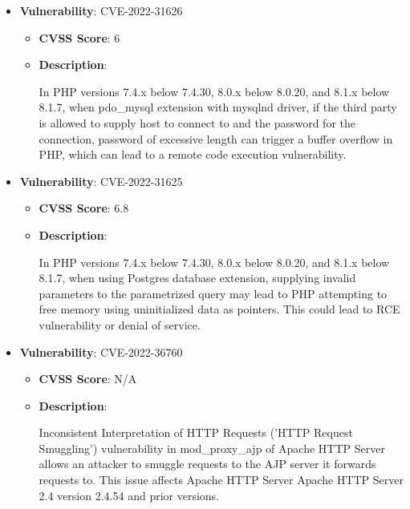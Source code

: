 \documentclass{article}
\begin{document}
\begin{itemize}
        \item \textbf{Vulnerability}: CVE-2022-31626
        \begin{itemize}
            \item \textbf{CVSS Score}:  6 
            \item \textbf{Description}:
            \parbox[t]{0.9\linewidth}{
                \ttfamily In PHP versions 7.4.x below 7.4.30, 8.0.x below 8.0.20, and 8.1.x below 8.1.7, when pdo\_mysql extension with mysqlnd driver, if the third party is allowed to supply host to connect to and the password for the connection, password of excessive length can trigger a buffer overflow in PHP, which can lead to a remote code execution vulnerability.
            }
        \end{itemize}
    
        \item \textbf{Vulnerability}: CVE-2022-31625
        \begin{itemize}
            \item \textbf{CVSS Score}:  6.8 
            \item \textbf{Description}:
            \parbox[t]{0.9\linewidth}{
                \ttfamily In PHP versions 7.4.x below 7.4.30, 8.0.x below 8.0.20, and 8.1.x below 8.1.7, when using Postgres database extension, supplying invalid parameters to the parametrized query may lead to PHP attempting to free memory using uninitialized data as pointers. This could lead to RCE vulnerability or denial of service.
            }
        \end{itemize}
    
        \item \textbf{Vulnerability}: CVE-2022-36760
        \begin{itemize}
            \item \textbf{CVSS Score}:  N/A 
            \item \textbf{Description}:
            \parbox[t]{0.9\linewidth}{
                \ttfamily Inconsistent Interpretation of HTTP Requests ('HTTP Request Smuggling') vulnerability in mod\_proxy\_ajp of Apache HTTP Server allows an attacker to smuggle requests to the AJP server it forwards requests to.  This issue affects Apache HTTP Server Apache HTTP Server 2.4 version 2.4.54 and prior versions.
            }
        \end{itemize}
    

\end{itemize}
\end{document}
